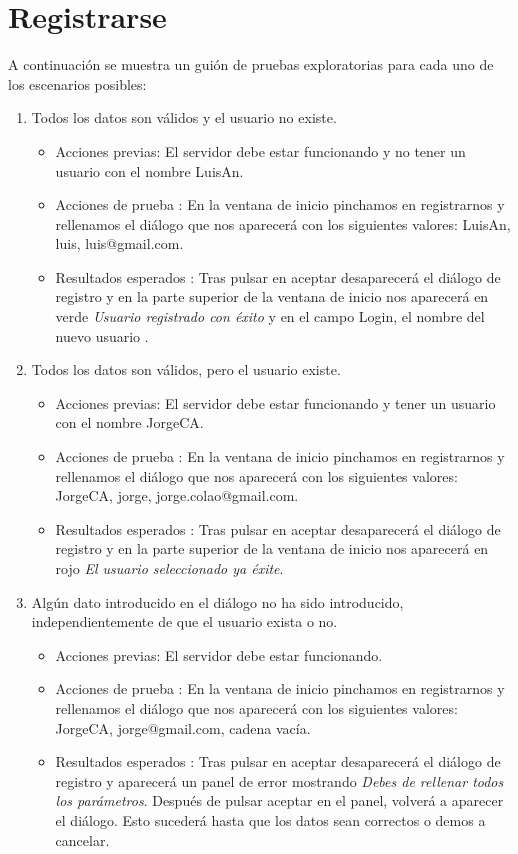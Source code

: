 \section{Registrarse}

A continuación se muestra un guión de pruebas exploratorias para cada uno de los escenarios posibles:
\begin{enumerate}
\item Todos los datos son válidos y el usuario no existe.
	\begin{itemize}
	\item Acciones previas: El servidor debe estar funcionando y no tener un usuario con el nombre LuisAn.
	\item Acciones de prueba : En la ventana de inicio pinchamos en registrarnos y rellenamos el diálogo que nos aparecerá con los siguientes valores: LuisAn, luis, luis@gmail.com.
	\item Resultados esperados : Tras pulsar en aceptar  desaparecerá el diálogo de registro y en la parte superior de la ventana de inicio nos aparecerá en verde \emph {Usuario registrado con éxito} y en el campo Login, el nombre del nuevo usuario .
	\end{itemize}

\item Todos los datos son válidos, pero el usuario existe.
	\begin{itemize}
	\item Acciones previas: El servidor debe estar funcionando y  tener un usuario con el nombre JorgeCA.
	\item Acciones de prueba : En la ventana de inicio pinchamos en registrarnos y rellenamos el diálogo que nos aparecerá con los siguientes valores: JorgeCA, jorge, jorge.colao@gmail.com.
	\item Resultados esperados : Tras pulsar en aceptar desaparecerá el diálogo de registro y en la parte superior de la ventana de inicio nos aparecerá en rojo \emph {El usuario seleccionado ya éxite}.
	\end{itemize}

\item Algún dato introducido en el diálogo no ha sido introducido, independientemente de que el usuario exista o no.
	\begin{itemize}
	\item Acciones previas: El servidor debe estar funcionando.
	\item Acciones de prueba : En la ventana de inicio pinchamos en registrarnos y rellenamos el diálogo que nos aparecerá con los siguientes valores: JorgeCA, jorge@gmail.com, cadena vacía.
	\item Resultados esperados : Tras pulsar en aceptar desaparecerá el diálogo de registro y aparecerá un panel de error mostrando \emph{Debes de rellenar todos los parámetros}. Después de pulsar aceptar en el panel, volverá a aparecer el diálogo. Esto sucederá hasta que los datos sean correctos o demos a cancelar.
	\end{itemize}


\end{enumerate}
